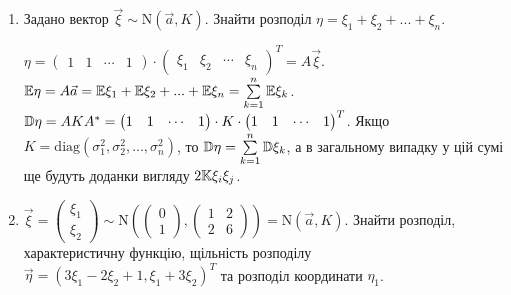 \begin{example}
    \begin{enumerate}
        \item Задано вектор $\vec{\xi} \sim \mathrm{N}(\vec{a}, K)$. Знайти розподіл $\eta = \xi_1 + \xi_2 + ... + \xi_n$.

        $\eta = \begin{pmatrix}
            1 & 1 & \cdots & 1
        \end{pmatrix}\cdot
        \begin{pmatrix}
            \xi_1 & \xi_2 & \cdots & \xi_n
        \end{pmatrix}^T = A\vec{\xi}$.
        $\mathbb{E}\eta = A\vec{a} = \mathbb{E}\xi_1 + \mathbb{E}\xi_2 + ... + \mathbb{E}\xi_n = \sum\limits_{k=1}^n \mathbb{E}\xi_k$.
        $\mathbb{D}\eta = A K A^{*} = \begin{pmatrix}
            1 & 1 & \cdots & 1
        \end{pmatrix}
        \cdot K \cdot \begin{pmatrix}
            1 & 1 & \cdots & 1
        \end{pmatrix}^T$. Якщо $K = \mathrm{diag}(\sigma_1^2, \sigma_2^2, ..., \sigma_n^2)$, то $\mathbb{D}\eta = \sum\limits_{k=1}^n \mathbb{D}\xi_k$,
        а в загальному випадку у цій сумі ще будуть доданки вигляду $2\mathbb{K}\xi_i\xi_j$.
        \item $\vec{\xi} = \begin{pmatrix}
            \xi_1 \\ \xi_2
        \end{pmatrix} \sim \mathrm{N}\left( \begin{pmatrix}
            0 \\ 1
        \end{pmatrix}, \begin{pmatrix}
            1 & 2 \\
            2 & 6
        \end{pmatrix}\right) = \mathrm{N}(\vec{a}, K)$. Знайти розподіл, характеристичну функцію, щільність розподілу 
        $\vec{\eta} = (3\xi_1-2\xi_2+1, \xi_1+3\xi_2)^T$ та розподіл координати $\eta_1$.


\end{enumerate}
\end{example}
